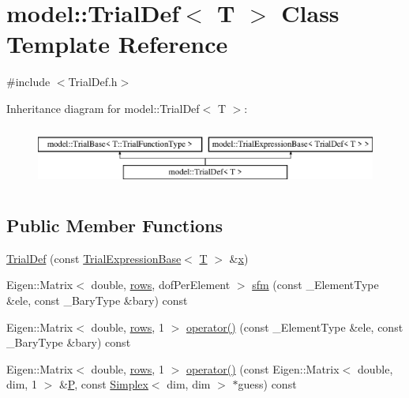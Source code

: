 \hypertarget{classmodel_1_1_trial_def}{}\section{model\+:\+:Trial\+Def$<$ T $>$ Class Template Reference}
\label{classmodel_1_1_trial_def}


{\ttfamily \#include $<$Trial\+Def.\+h$>$}

Inheritance diagram for model\+:\+:Trial\+Def$<$ T $>$\+:\begin{figure}[H]
\begin{center}
\leavevmode
\includegraphics[height=2.000000cm]{classmodel_1_1_trial_def}
\end{center}
\end{figure}
\subsection*{Public Member Functions}
\begin{DoxyCompactItemize}
\item 
\hyperlink{classmodel_1_1_trial_def_a4b061e4f2c210b32d1b50c5fbdf4dd75}{Trial\+Def} (const \hyperlink{structmodel_1_1_trial_expression_base}{Trial\+Expression\+Base}$<$ \hyperlink{_spline_node_base__corder1_8h_a82692d3a5502b91460591f1d5504314a}{T} $>$ \&\hyperlink{generate_s_t_lcyl_8m_a9336ebf25087d91c818ee6e9ec29f8c1}{x})
\item 
Eigen\+::\+Matrix$<$ double, \hyperlink{classmodel_1_1_trial_def_a4b5daaa9286e1caa2da297c553201fcd}{rows}, dof\+Per\+Element $>$ \hyperlink{classmodel_1_1_trial_def_aa48ccab183f67c51b3a77142b3ec97cb}{sfm} (const \+\_\+\+Element\+Type \&ele, const \+\_\+\+Bary\+Type \&bary) const 
\item 
Eigen\+::\+Matrix$<$ double, \hyperlink{classmodel_1_1_trial_def_a4b5daaa9286e1caa2da297c553201fcd}{rows}, 1 $>$ \hyperlink{classmodel_1_1_trial_def_a2dc33c3a2c421b30831d0e0bfd97ce04}{operator()} (const \+\_\+\+Element\+Type \&ele, const \+\_\+\+Bary\+Type \&bary) const 
\item 
Eigen\+::\+Matrix$<$ double, \hyperlink{classmodel_1_1_trial_def_a4b5daaa9286e1caa2da297c553201fcd}{rows}, 1 $>$ \hyperlink{classmodel_1_1_trial_def_adbc461ffed70f6bd3b4d9d63815f97b6}{operator()} (const Eigen\+::\+Matrix$<$ double, dim, 1 $>$ \&\hyperlink{_f_e_m_2linear__elasticity__3d_2tetgen_2generate_p_o_l_ycube_8m_a50a9afb44201a65ab7ad5feb2150aeb6}{P}, const \hyperlink{classmodel_1_1_simplex}{Simplex}$<$ dim, dim $>$ $\ast$guess) const 
\end{DoxyCompactItemize}
